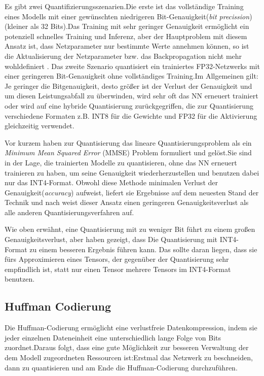 \documentclass[12pt,a4paper]{scrartcl}
\numberwithin{equation}{section}
\begin{document}
Es gibt zwei Quantifizierungsszenarien.Die erste ist das vollständige Training eines Modells mit einer gewünschten niedrigeren Bit-Genauigkeit(\textit{bit precission})(kleiner als 32 Bits).Das Training mit sehr geringer Genauigkeit ermöglicht ein potenziell schnelles Training und Inferenz, aber der Hauptproblem mit diesem Ansatz ist, dass Netzparameter nur bestimmte Werte annehmen können, so ist die Aktualisierung der Netzparameter bzw. das Backpropagation nicht mehr wohldefiniert \cite{quantizationYoni}.
Das zweite Szenario  quantisiert ein trainiertes FP32-Netzwerks mit einer geringeren Bit-Genauigkeit ohne vollständiges Training.Im Allgemeinen gilt: Je geringer die Bitgenauigkeit, desto größer ist der Verlust der Genauigkeit und um diesen Leistungsabfall zu überwinden, wird sehr oft das \ac{NN} erneuert trainiert oder wird auf eine hybride Quantisierung zurückgegriffen, die zur Quantisierung verschiedene Formaten z.B. INT8 für die Gewichte und FP32 für die Aktivierung gleichzeitig verwendet.

Vor kurzem haben \cite[Yoni et al]{quantizationYoni} zur  Quantisierung  das lineare Quantisierungsproblem als ein \textit{Minimum Mean Squared Error} (MMSE) Problem formuliert und gelöst.Sie sind in der Lage, die trainierten Modelle zu quantisieren, ohne das \ac{NN} erneuert trainieren zu haben, um seine Genauigkeit wiederherzustellen und benutzen dabei nur das INT4-Format. Obwohl diese Methode  minimalen Verlust der Genauigkeit(\textit{accuracy}) aufweist, liefert sie Ergebnisse auf dem neuesten Stand der Technik und nach \cite{quantizationYoni} weist dieser Ansatz einen geringeren Genauigkeitsverlust als alle anderen Quantisierungsverfahren auf.

Wie oben erwähnt, eine Quantisierung mit zu weniger Bit führt zu einem großen Genauigkeitsverlust, aber \cite[Yoni et al]{quantizationYoni} haben gezeigt, dass Die Quantisierung mit INT4-Format zu einem besseren Ergebnis führen kann. Das sollte daran liegen, dass sie fürs Approximieren eines Tensors, der gegenüber der Quantisierung sehr empfindlich ist, statt nur einen Tensor mehrere Tensors im INT4-Format benutzen.

\subsection{Huffman Codierung}
Die Huffman-Codierung ermöglicht eine verlustfreie Datenkompression, indem sie jeder einzelnen Dateneinheit  eine unterschiedlich lange Folge von Bits zuordnet.Daraus folgt, dass eine gute Möglichkeit zur besseren Verwaltung der dem Modell zugeordneten Ressourcen ist:Erstmal das Netzwerk zu beschneiden, dann zu quantisieren und am Ende die Huffman-Codierung durchzuführen. 
\end{document}
